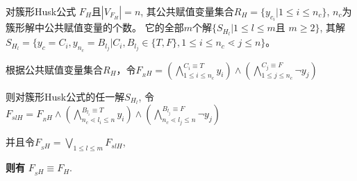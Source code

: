 \begin{lemma}\label{4:CHE}

对簇形Husk公式 ${F_H}$且$|V_{F_H}|= n$,
其公共赋值变量集合$R_H=\{y_{c_i}|1\leqslant i\leqslant n_c\}$,
$n_c$为簇形解中公共赋值变量的个数。
它的全部$m$个解$\{S_{H_l}|1\leqslant l\leqslant m $且 $m \geqslant 2\}$,
其解
$S_{H_l}=\{y_c=C_i, y_{n_c}=B_{l_j}|C_i,B_{l_j} \in \{T,F\}, 1\leqslant i\leqslant n_c \lessdot j\leqslant n\}$。


根据公共赋值变量集合$R_H$，令$F_{_RH}=
(\bigwedge_{1\leqslant i\leqslant n_c}^{C_i\equiv T} y_i)\wedge
(\bigwedge_{1\leqslant j\leqslant n_c}^{C_j\equiv F}\neg y_j)$

则对簇形Husk公式的任一解$S_{H_l}$, 令$F_{slH}=F_{_RH}\wedge
(\bigwedge_{n_c\lessdot l_i\leqslant n}^{B_{l_i}\equiv T} y_i)\wedge
(\bigwedge_{n_c\lessdot l_j\leqslant n}^{B_{l_j}\equiv F}\neg y_j)$

并且令$F_{_SH}=\bigvee_{1\leqslant l\leqslant m}F_{slH}$,

\textbf{则有}  $F_{_SH} \equiv F_H $.
\end{lemma}

